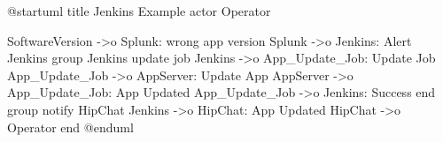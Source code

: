 @startuml
title Jenkins Example
actor Operator

SoftwareVersion ->o Splunk: wrong app version
Splunk ->o Jenkins: Alert Jenkins
group Jenkins update job
  Jenkins ->o App_Update_Job: Update Job
  App_Update_Job ->o AppServer: Update App
  AppServer ->o App_Update_Job: App Updated
  App_Update_Job ->o Jenkins: Success
end
group notify HipChat
  Jenkins ->o HipChat: App Updated
  HipChat ->o Operator
end
@enduml
